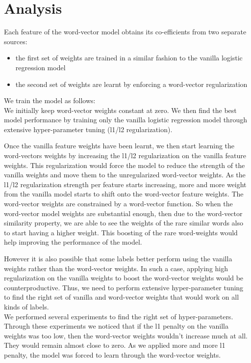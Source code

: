 \newpage
\chapter{Analysis}

Each feature of the word-vector model obtains its co-efficients from two separate sources:
\begin{itemize}
\item the first set of weights are trained in a similar fashion to the vanilla logistic regression model
\item the second set of weights are learnt by enforcing a word-vector regularization
\end{itemize}

We train the model as follows:\\

We initially keep word-vector weights constant at zero.
We then find the best model performance by training only the vanilla logistic regression model through extensive hyper-parameter tuning (l1/l2 regularization).

Once the vanilla feature weights have been learnt, we then start learning the word-vectors weights by increasing the l1/l2 regularization on the vanilla feature weights. This regularization would force the model to reduce the strength of the vanilla weights and move them to the unregularized word-vector weights. As the l1/l2 regularization strength per feature starts increasing, more and more weight from the vanilla model starts to shift onto the word-vector feature weights. 
The word-vector weights are constrained by a word-vector function. So when the word-vector model weights are substantial enough, then due to the word-vector similarity property, we are able to see the weights of the rare similar words also to start having a higher weight. This boosting of the rare word-weights would help improving the performance of the model.

However it is also possible that some labels better perform using the vanilla weights rather than the word-vector weights. In such a case, applying high regularization on the vanilla weights to boost the word-vector weights would be counterproductive. Thus, we need to perform extensive hyper-parameter tuning to find the right set of vanilla and word-vector weights that would work on all kinds of labels.\\

We performed several experiments to find the right set of hyper-parameters. Through these experiments we noticed that if the l1 penalty on the vanilla weights was too low, then the word-vector weights wouldn't increase much at all. They would remain almost close to zero. As we applied more and more l1 penalty, the model was forced to learn through the word-vector weights. 

